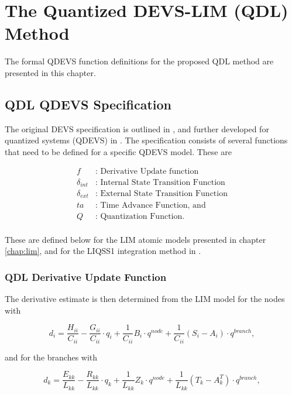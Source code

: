 
\chapter{The Quantized DEVS-LIM (QDL) Method}\label{chap:qdl}

The formal QDEVS function definitions for the proposed QDL method are presented in this chapter.

\section{QDL QDEVS Specification}

The original DEVS specification is outlined in \cite{zeigler2002}, and further developed for quantized systems (QDEVS) in \cite{zeigler1999}. The specification consists of several functions that need to be defined for a specific QDEVS model. These are

\begin{align*}
    f            & \text{:   Derivative Update function} \\
    \delta_{int} & \text{:   Internal State Transition Function} \\
    \delta_{ext} & \text{:   External State Transition Function} \\
    ta           & \text{:   Time Advance Function, and} \\
    Q            & \text{:   Quantization Function.}  \\
\end{align*}

These are defined below for the LIM atomic models presented in chapter \ref{chap:lim}, and for the LIQSS1 integration method in \cite{migoni2013}.

\subsection{QDL Derivative Update Function}

The derivative estimate is then determined from the LIM model for the nodes with

\begin{equation}\label{eq:d_func_node}
    d_i = \frac{H_{ii}}{C_{ii}} - \frac{G_{ii}}{C_{ii}} \cdot q_i + \frac{1}{C_{ii}} B_i \cdot q^{node} + \frac{1}{C_{ii}} \left(S_i - A_i\right) \cdot q^{branch},
\end{equation}

\noindent and for the branches with

\begin{equation}\label{eq:d_func_branch}
    d_k = \frac{E_{kk}}{L_{kk}} - \frac{R_{kk}}{L_{kk}} \cdot q_k + \frac{1}{L_{kk}} Z_k \cdot q^{node} + \frac{1}{L_{kk}} \left(T_k - A_k^T\right) \cdot q^{branch}, 
\end{equation}

